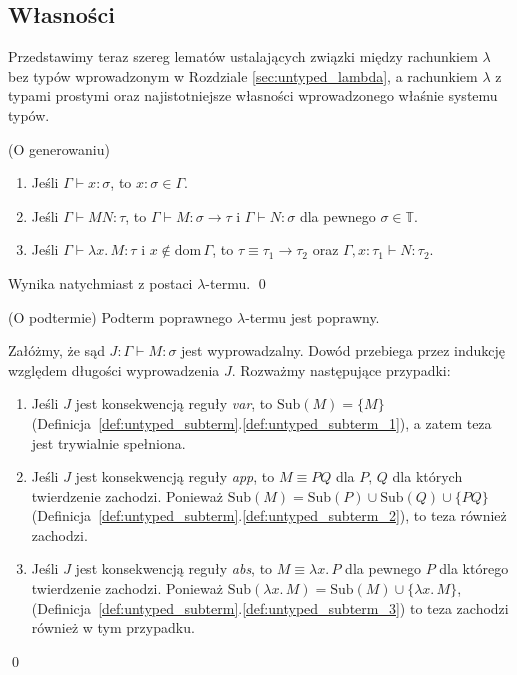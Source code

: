 \subsection{Własności}

Przedstawimy teraz szereg lematów ustalających związki między rachunkiem \(\lambda\) bez typów wprowadzonym w Rozdziale \ref{sec:untyped_lambda}, a rachunkiem \(\lambda\) z typami prostymi oraz najistotniejsze własności wprowadzonego właśnie systemu typów.

\begin{lemat}(O generowaniu)\label{thm:generation}
  \begin{enumerate}[label=(\arabic*)]
     \setlength\itemsep{0em}
     \item Jeśli \(\Gamma\vdash x:\sigma\), to \(x:\sigma\in\Gamma\).\label{thm:generation_1}
     \item Jeśli \(\Gamma\vdash MN:\tau\), to \(\Gamma\vdash M:\sigma\to\tau\) i \(\Gamma\vdash N:\sigma\) dla pewnego \(\sigma\in\mathbb{T}\).\label{thm:generation_2}
     \item Jeśli \(\Gamma\vdash\lambda x.\, M:\tau\) i \(x\not\in\mathrm{dom}\,\Gamma\), to \(\tau\equiv \tau_1\to\tau_2\) oraz \(\Gamma,x:\tau_1\vdash N:\tau_2\). \label{thm:generation_3}
  \end{enumerate} 
\end{lemat}
\begin{dowod}
  Wynika natychmiast z postaci \(\lambda\)-termu.  \qed
\end{dowod}

\begin{lemat}(O podtermie)\label{thm:subterm}
  Podterm poprawnego \(\lambda\)-termu jest poprawny.
\end{lemat}
\begin{dowod}
  Załóżmy, że sąd \(J: \Gamma\vdash M:\sigma\) jest wyprowadzalny. Dowód przebiega przez indukcję względem długości wyprowadzenia \(J\). Rozważmy następujące przypadki:
  \begin{enumerate}[label=(\alph*)]
    \setlength\itemsep{0em}
    \item Jeśli \(J\) jest konsekwencją reguły \emph{var}, to \(\mathrm{Sub}(M)=\{M\}\) (Definicja~\ref{def:untyped_subterm}.\ref{def:untyped_subterm_1}), a zatem teza jest trywialnie spełniona.
     \item Jeśli \(J\) jest konsekwencją reguły \emph{app}, to \(M\equiv PQ\) dla \(P,\,Q\) dla których twierdzenie zachodzi. Ponieważ \(\mathrm{Sub}(M)=\mathrm{Sub}(P)\cup\mathrm{Sub}(Q)\cup\{PQ\}\) (Definicja~\ref{def:untyped_subterm}.\ref{def:untyped_subterm_2}), to teza również zachodzi.
    \item Jeśli \(J\) jest konsekwencją reguły \emph{abs}, to \(M\equiv \lambda
      x.\,P\) dla pewnego \(P\) dla którego twierdzenie zachodzi. Ponieważ
      \(\mathrm{Sub}(\lambda x.\,M) = \mathrm{Sub}(M) \cup \{\lambda x.\,M\}\),
      (Definicja~\ref{def:untyped_subterm}.\ref{def:untyped_subterm_3})
      to teza zachodzi również w tym przypadku.
  \end{enumerate}
  \qed
\end{dowod}

